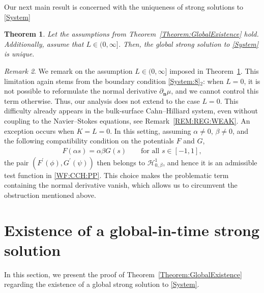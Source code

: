 \documentclass[10pt,reqno]{amsart}
\newtheorem{theorem}{Theorem}[section]
\theoremstyle{remark}
\newtheorem{remark}[theorem]{Remark}
\numberwithin{equation}{section}
\newcommand{\n}{\mathbf{n}}
\newcommand{\deln}{\partial_\n}
\begin{document}
Our next main result is concerned with the uniqueness of strong solutions to \eqref{System}
\begin{theorem}\label{Theorem:Uniqueness}
    Let the assumptions from Theorem~\ref{Theorem:GlobalExistence} hold. Additionally, assume that $L\in(0,\infty]$. Then, the global strong solution to \eqref{System} is unique.
\end{theorem}

\begin{remark}
    We remark on the assumption $L\in(0,\infty]$ imposed in Theorem~\ref{Theorem:Uniqueness}. This limitation again stems from the boundary condition \eqref{System:8}$_2$: when $L=0$, it is not possible to reformulate the normal derivative $\deln \mu$, and we cannot control this term otherwise. Thus, our analysis does not extend to the case $L = 0$. This difficulty already appears in the bulk-surface Cahn--Hilliard system, even without coupling to the Navier--Stokes equations, see Remark~\ref{REM:REG:WEAK}.
    An exception occurs when $K=L=0$. In this setting, assuming $\alpha\neq 0$, $\beta\neq 0$, and the following compatibility condition on the potentials $F$ and $G$,
    \begin{align*}
        F(\alpha s) = \alpha\beta G(s) \qquad\text{for all~}s\in[-1,1],
    \end{align*}
    the pair $(F^\prime(\phi), G^\prime(\psi))$ then belongs to $\mathcal{H}^1_{0,\beta}$, and hence it is an admissible test function in \eqref{WF:CCH:PP}. This choice makes the problematic term containing the normal derivative vanish, which allows us to circumvent the obstruction mentioned above.
\end{remark}


\medskip

\section{Existence of a global-in-time strong solution}
\label{Section:LocalWellPosedness}

In this section, we present the proof of Theorem~\ref{Theorem:GlobalExistence} regarding the existence of a global strong solution to \eqref{System}.
\end{document}
